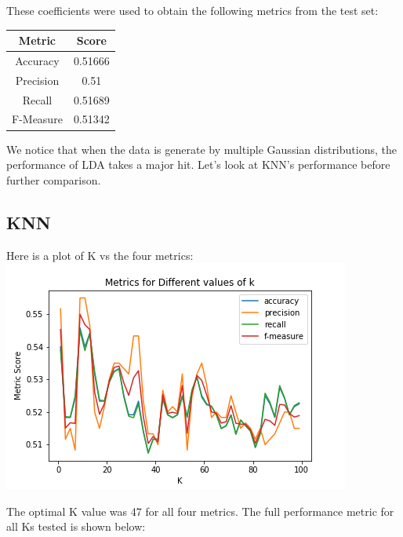 \documentclass{article}
\begin{document}
These coefficients were used to obtain the following metrics from the test set:
\begin{center}
\begin{tabular}{ |c|c| } 
    \hline
    \textbf{Metric} & \textbf{Score} \\ 
    \hline
    Accuracy & 0.51666 \\
    Precision & 0.51 \\ 
    Recall & 0.51689 \\
    F-Measure & 0.51342 \\
    \hline
\end{tabular}
\end{center}

We notice that when the data is generate by multiple Gaussian distributions, the performance of LDA takes a major hit. Let's look at KNN's performance before further comparison.

\subsection{KNN}
Here is a plot of K vs the four metrics: \\
\includegraphics[width=\linewidth]{knn_q5.png}

The optimal K value was 47 for all four metrics. The full performance metric for all Ks tested is shown below:
\end{document}
